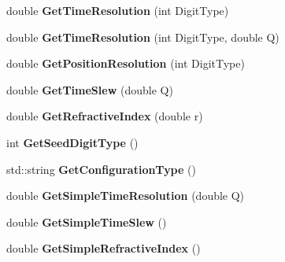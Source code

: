 \begin{DoxyCompactItemize}
\item 
\hypertarget{classParameters_a9923cf8f51802396ddb7deea4329104d}{double {\bfseries Get\-Time\-Resolution} (int Digit\-Type)}\label{classParameters_a9923cf8f51802396ddb7deea4329104d}

\item 
\hypertarget{classParameters_ae4c02a415ab0ac0290aa4e5b937130f0}{double {\bfseries Get\-Time\-Resolution} (int Digit\-Type, double Q)}\label{classParameters_ae4c02a415ab0ac0290aa4e5b937130f0}

\item 
\hypertarget{classParameters_a86cfc7d93752dcd1549935fd4c3ef3be}{double {\bfseries Get\-Position\-Resolution} (int Digit\-Type)}\label{classParameters_a86cfc7d93752dcd1549935fd4c3ef3be}

\item 
\hypertarget{classParameters_a59b9a4a70d5b3a1806e85409ab59fa06}{double {\bfseries Get\-Time\-Slew} (double Q)}\label{classParameters_a59b9a4a70d5b3a1806e85409ab59fa06}

\item 
\hypertarget{classParameters_af68d5a1e8b879d8bd3e40619dbdcad17}{double {\bfseries Get\-Refractive\-Index} (double r)}\label{classParameters_af68d5a1e8b879d8bd3e40619dbdcad17}

\item 
\hypertarget{classParameters_a87885862d3dec908cc69488f9a5ba414}{int {\bfseries Get\-Seed\-Digit\-Type} ()}\label{classParameters_a87885862d3dec908cc69488f9a5ba414}

\item 
\hypertarget{classParameters_a7af86855d446b0d87990a5ee0bec878d}{std\-::string {\bfseries Get\-Configuration\-Type} ()}\label{classParameters_a7af86855d446b0d87990a5ee0bec878d}

\item 
\hypertarget{classParameters_a5dc92999b540e49c64c0d9cf989a0a57}{double {\bfseries Get\-Simple\-Time\-Resolution} (double Q)}\label{classParameters_a5dc92999b540e49c64c0d9cf989a0a57}

\item 
\hypertarget{classParameters_a9171fa97b63774daaaab2ba0a4534846}{double {\bfseries Get\-Simple\-Time\-Slew} ()}\label{classParameters_a9171fa97b63774daaaab2ba0a4534846}

\item 
\hypertarget{classParameters_a30c2cab5179a2beb2ad468f8de91b3c0}{double {\bfseries Get\-Simple\-Refractive\-Index} ()}\label{classParameters_a30c2cab5179a2beb2ad468f8de91b3c0}

\end{DoxyCompactItemize}
